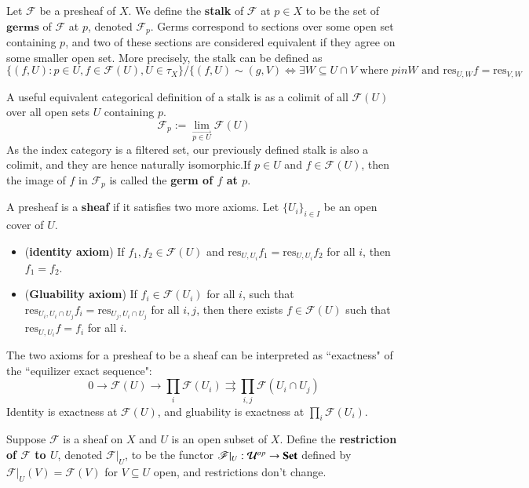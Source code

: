 \begin{definition}
    Let $\mathscr{F}$ be a presheaf of $X$. We define the \textbf{stalk} of $\mathscr{F}$ at $p \in X$ to be the set of $\textbf{germs}$ of $\mathscr{F}$ at $p$, denoted $\mathscr{F}_p$. Germs correspond to sections over some open set containing $p$, and two of these sections are considered equivalent if they agree on some smaller open set. More precisely, the stalk can be defined as $$\{(f,U):p \in U,f \in \mathscr{F}(U), U \in \tau_X\}/\{(f,U)\sim(g,V) \iff \exists W \subseteq U\cap V\text{ where }p in W\text{ and }\text{res}_{U,W}f = \text{res}_{V,W}$$
\end{definition}
A useful equivalent categorical definition of a stalk is as a colimit of all $\mathscr{F}(U)$ over all open sets $U$ containing $p$. \begin{equation*}
    \mathscr{F}_p := \lim\limits_{\overrightarrow{p \in U}}\mathscr{F}(U)
\end{equation*}
As the index category is a filtered set, our previously defined stalk is also a colimit, and they are hence naturally isomorphic.If $p \in U$ and $f \in \mathscr{F}(U)$, then the image of $f$ in $\mathscr{F}_p$ is called the \textbf{germ of $f$ at $p$}. 

\begin{definition}
    A presheaf is a \textbf{sheaf} if it satisfies two more axioms. Let $\{U_i\}_{i \in I}$ be an open cover of $U$. \begin{itemize}
        \item (\textbf{identity axiom}) If $f_1,f_2 \in \mathscr{F}(U)$ and $\text{res}_{U,U_i}f_1 = \text{res}_{U,U_i}f_2$ for all $i$, then $f_1 = f_2$.
        \item (\textbf{Gluability axiom}) If $f_i \in \mathscr{F}(U_i)$ for all $i$, such that $\text{res}_{U_i,U_i\cap U_j}f_i = \text{res}_{U_j,U_i\cap U_j}$ for all $i,j$, then there exists $f \in \mathscr{F}(U)$ such that $\text{res}_{U,U_i}f = f_i$ for all $i$.
    \end{itemize}
\end{definition}

The two axioms for a presheaf to be a sheaf can be interpreted as ``exactness" of the ``equilizer exact sequence": $$0\rightarrow \mathscr{F}(U)\rightarrow \prod_i\mathscr{F}(U_i)\rightrightarrows\prod_{i,j}\mathscr{F}(U_i\cap U_j)$$
Identity is exactness at $\mathscr{F}(U)$, and gluability is exactness at $\prod_i\mathscr{F}(U_i)$.

\begin{example}
    Suppose $\mathscr{F}$ is a sheaf on $X$ and $U$ is an open subset of $X$. Define the \textbf{restriction of $\mathscr{F}$ to $U$}, denoted $\mathscr{F}\vert_U$, to be the functor $\mathscr{F}\vert_U:\mathcal{U}^{op}\rightarrow \normalfont\textbf{Set}$ defined by $\mathscr{F}\vert_U(V) = \mathscr{F}(V)$ for $V \subseteq U$ open, and restrictions don't change.
\end{example}

